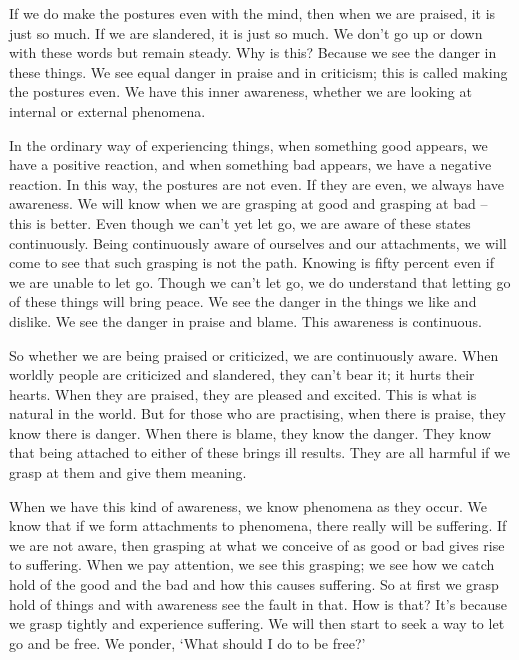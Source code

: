 If we do make the postures even with the mind, then when we are praised, it is just so much. If we are slandered, it is just so much. We don't go up or down with these words but remain steady. Why is this? Because we see the danger in these things. We see equal danger in praise and in criticism; this is called making the postures even. We have this inner awareness, whether we are looking at internal or external phenomena.

In the ordinary way of experiencing things, when something good appears, we have a positive reaction, and when something bad appears, we have a negative reaction. In this way, the postures are not even. If they are even, we always have awareness. We will know when we are grasping at good and grasping at bad -- this is better. Even though we can't yet let go, we are aware of these states continuously. Being continuously aware of ourselves and our attachments, we will come to see that such grasping is not the path. Knowing is fifty percent even if we are unable to let go. Though we can't let go, we do understand that letting go of these things will bring peace. We see the danger in the things we like and dislike. We see the danger in praise and blame. This awareness is continuous.

So whether we are being praised or criticized, we are continuously aware. When worldly people are criticized and slandered, they can't bear it; it hurts their hearts. When they are praised, they are pleased and excited. This is what is natural in the world. But for those who are practising, when there is praise, they know there is danger. When there is blame, they know the danger. They know that being attached to either of these brings ill results. They are all harmful if we grasp at them and give them meaning.

When we have this kind of awareness, we know phenomena as they occur. We know that if we form attachments to phenomena, there really will be suffering. If we are not aware, then grasping at what we conceive of as good or bad gives rise to suffering. When we pay attention, we see this grasping; we see how we catch hold of the good and the bad and how this causes suffering. So at first we grasp hold of things and with awareness see the fault in that. How is that? It's because we grasp tightly and experience suffering. We will then start to seek a way to let go and be free. We ponder, `What should I do to be free?'

